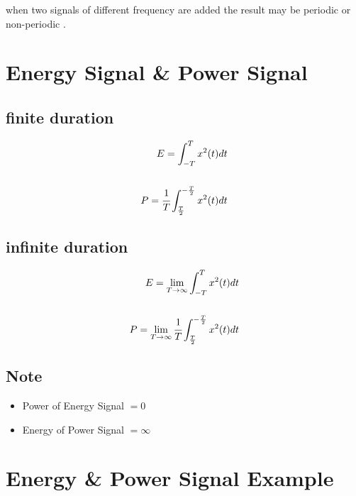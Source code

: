 \documentclass[12pt]{article}
\begin{document}
\noindent
when two signals of different frequency are added the result may be periodic or non-periodic .










\section{Energy Signal \& Power Signal}



\subsection{finite duration}

\begin{align*}
E = \int_{-T}^{T}{x^{2}(t)dt} \\ \\
P = \cfrac{1}{T} \int_{\frac{T}{2}}^{-\frac{T}{2}}{x^{2}(t)dt}
\end{align*}





\subsection{infinite duration}



\begin{align*}
E = \lim_{T\to\infty}{\int_{-T}^{T}{x^{2}(t)dt}} \\ \\
P = \lim_{T\to\infty}{\cfrac{1}{T} \int_{\frac{T}{2}}^{-\frac{T}{2}}{x^{2}(t)dt}}
\end{align*}






\subsection{Note}


\begin{itemize}
	\item Power of Energy Signal $= 0$
	\item Energy of Power Signal $= \infty$
\end{itemize}




\section{Energy \& Power Signal Example}
\end{document}
